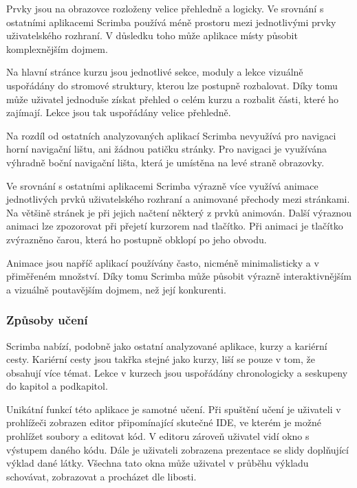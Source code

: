Prvky jsou na obrazovce rozloženy velice přehledně a logicky. Ve srovnání s ostatními aplikacemi Scrimba používá méně prostoru mezi jednotlivými prvky uživatelského rozhraní. V důsledku toho může aplikace místy působit komplexnějším dojmem.

Na hlavní stránce kurzu jsou jednotlivé sekce, moduly a lekce vizuálně uspořádány do stromové struktury, kterou lze postupně rozbalovat. Díky tomu může uživatel jednoduše získat přehled o celém kurzu a rozbalit části, které ho zajímají. Lekce jsou tak uspořádány velice přehledně.


Na rozdíl od ostatních analyzovaných aplikací Scrimba nevyužívá pro navigaci horní navigační lištu, ani žádnou patičku stránky. Pro navigaci je využívána výhradně boční navigační lišta, která je umístěna na levé straně obrazovky.


Ve srovnání s ostatními aplikacemi Scrimba výrazně více využívá animace jednotlivých prvků uživatelského rozhraní a animované přechody mezi stránkami. Na většině stránek je při jejich načtení některý z prvků animován. Další výraznou animaci lze zpozorovat při přejetí kurzorem nad tlačítko. Při animaci je tlačítko zvýrazněno čarou, která ho postupně obklopí po jeho obvodu.

Animace jsou napříč aplikací používány často, nicméně minimalisticky a v přiměřeném množství. Díky tomu Scrimba může působit výrazně interaktivnějším a vizuálně poutavějším dojmem, než její konkurenti.

\subsubsection{Způsoby učení}


Scrimba nabízí, podobně jako ostatní analyzované aplikace, kurzy a kariérní cesty. Kariérní cesty jsou takřka stejné jako kurzy, liší se pouze v tom, že obsahují více témat. Lekce v kurzech jsou uspořádány chronologicky a seskupeny do kapitol a podkapitol.


Unikátní funkcí této aplikace je samotné učení. Při spuštění učení je uživateli v prohlížeči zobrazen editor připomínající skutečné IDE, ve kterém je možné prohlížet soubory a editovat kód. V editoru zároveň uživatel vidí okno s výstupem daného kódu. Dále je uživateli zobrazena prezentace se slidy doplňující výklad dané látky. Všechna tato okna může uživatel v průběhu výkladu schovávat, zobrazovat a procházet dle libosti.

